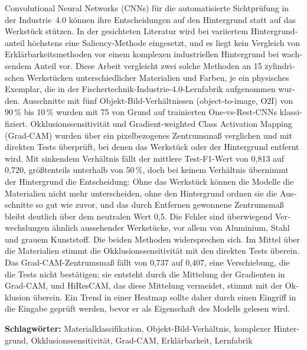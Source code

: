 \begin{otherlanguage}{ngerman}
Convolutional Neural Networks (CNNs) für die automatisierte Sichtprüfung in der
Industrie~4.0 können ihre Entscheidungen auf den Hintergrund statt auf das Werkstück
stützen. In der gesichteten Literatur wird bei variiertem Hintergrundanteil höchstens
eine Saliency-Methode eingesetzt, und es liegt kein Vergleich von
Erklärbarkeitsmethoden vor einem komplexen industriellen Hintergrund bei wachsendem
Anteil vor. Diese Arbeit vergleicht zwei solche Methoden an 15 zylindrischen Werkstücken
unterschiedlicher Materialien und Farben, je ein physisches Exemplar, die in der
Fischertechnik-Industrie-4.0-Lernfabrik aufgenommen wurden. Ausschnitte mit fünf
Objekt-Bild-Verhältnissen (object-to-image, O2I) von 90\,\% bis 10\,\% wurden mit 75 von
Grund auf trainierten One-vs-Rest-CNNs klassifiziert. Okklusionssensitivität und
Gradient-weighted Class Activation Mapping (Grad-CAM) wurden über ein pixelbezogenes
Zentrumsmaß verglichen und mit direkten Tests überprüft, bei denen das Werkstück oder
der Hintergrund entfernt wird. Mit sinkendem Verhältnis fällt der mittlere
Test-F1-Wert von 0,813 auf 0,720, größtenteils unterhalb von 50\,\%, doch bei keinem
Verhältnis übernimmt der Hintergrund die Entscheidung: Ohne das Werkstück können die
Modelle die Materialien nicht mehr unterscheiden, ohne den Hintergrund ordnen sie die
Ausschnitte so gut wie zuvor, und das durch Entfernen gewonnene Zentrumsmaß bleibt
deutlich über dem neutralen Wert 0,5. Die Fehler sind überwiegend Verwechslungen
ähnlich aussehender Werkstücke, vor allem von Aluminium, Stahl und grauem Kunststoff.
Die beiden Methoden widersprechen sich. Im Mittel über die Materialien stimmt die
Okklusionssensitivität mit den direkten Tests überein. Das Grad-CAM-Zentrumsmaß fällt von 0,737 auf 0,407, eine
Verschiebung, die die Tests nicht bestätigen; sie entsteht durch die Mittelung der
Gradienten in Grad-CAM, und HiResCAM, das diese Mittelung vermeidet, stimmt mit der
Okklusion überein. Ein Trend in einer Heatmap sollte daher durch einen Eingriff in die
Eingabe geprüft werden, bevor er als Eigenschaft des Modells gelesen wird.

\vspace{1cm}
\noindent\textbf{Schlagwörter:} Materialklassifikation, Objekt-Bild-Verhältnis, komplexer
Hintergrund, Okklusionssensitivität, Grad-CAM, Erklärbarkeit, Lernfabrik
\end{otherlanguage}

